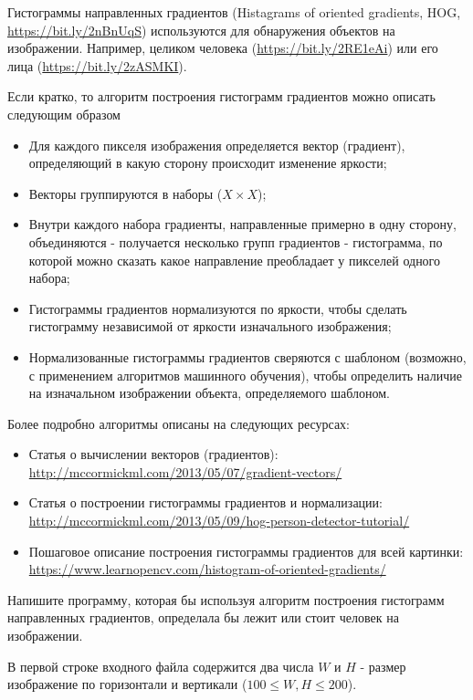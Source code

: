 
Гистограммы направленных градиентов (Histagrams of oriented gradients, HOG, \url{https://bit.ly/2nBnUqS}) используются для обнаружения объектов на изображении.
Например, целиком человека (\url{https://bit.ly/2RE1eAi}) или его лица (\url{https://bit.ly/2zASMKI}).

Если кратко, то алгоритм построения гистограмм градиентов можно описать следующим образом
\begin{itemize}
  \item Для каждого пикселя изображения определяется вектор (градиент), определяющий в какую сторону происходит изменение яркости;
  \item Векторы группируются в наборы ($X \times X$);
  \item Внутри каждого набора градиенты, направленные примерно в одну сторону, объединяются - получается несколько групп градиентов - гистограмма, по которой можно сказать какое направление преобладает у пикселей одного набора;
  \item Гистограммы градиентов нормализуются по яркости, чтобы сделать гистограмму независимой от яркости изначального изображения;
  \item Нормализованные гистограммы градиентов сверяются с шаблоном (возможно, с применением алгоритмов машинного обучения), чтобы определить наличие на изначальном изображении объекта, определяемого шаблоном. 
\end{itemize}

Более подробно алгоритмы описаны на следующих ресурсах:
\begin{itemize}
  \item Статья о вычислении векторов (градиентов): \url{http://mccormickml.com/2013/05/07/gradient-vectors/}
  \item Статья о построении гистограммы градиентов и нормализации: \url{http://mccormickml.com/2013/05/09/hog-person-detector-tutorial/} 
  \item Пошаговое описание построения гистограммы градиентов для всей картинки: \url{https://www.learnopencv.com/histogram-of-oriented-gradients/}
\end{itemize}

Напишите программу, которая бы используя алгоритм построения гистограмм направленных градиентов, определала бы лежит или стоит человек на изображении.


В первой строке входного файла содержится два числа $W$ и $H$ - размер изображение по горизонтали и вертикали ($100 \le W, H \le 200$).

